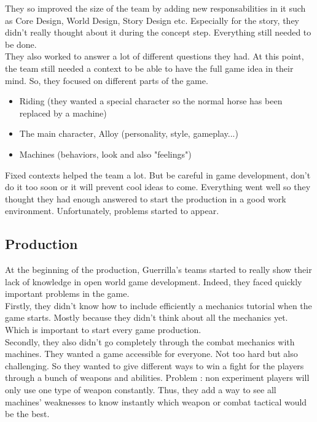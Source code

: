\documentclass[a4paper]{article}
\begin{document}
\noindent They so improved the size of the team by adding new responsabilities in it such as Core Design,
World Design, Story Design etc. Especially for the story, they didn't really thought about it
during the concept step. Everything still needed to be done.\\

\noindent They also worked to answer a lot of different questions they had. At this point, the team
still needed a context to be able to have the full game idea in their mind. So, they focused on
different parts of the game.
\begin{itemize}
  \item Riding (they wanted a special character so the normal horse has been replaced by a machine)
  \item The main character, Alloy (personality, style, gameplay...)
  \item Machines (behaviors, look and also "feelings")
\end{itemize}

\noindent Fixed contexts helped the team a lot. But be careful in game development, don't do it too 
soon or it will prevent cool ideas to come. Everything went well so they thought they had enough
answered to start the production in a good work environment. Unfortunately, problems started to appear.


\subsection{Production}

At the beginning of the production, Guerrilla's teams started to really show their lack of
knowledge in open world game development. Indeed, they faced quickly important problems in the game.\\

\noindent Firstly, they didn't know how to include efficiently a mechanics tutorial when the game starts.
Mostly because they didn't think about all the mechanics yet. Which is important to start every game
production.\\

\noindent Secondly, they also didn't go completely through the combat mechanics with machines.
They wanted a game accessible for everyone. Not too hard but also challenging. So they wanted
to give different ways to win a fight for the players through a bunch of weapons and abilities. Problem :
non experiment players will only use one type of weapon constantly. Thus, they add a way to see 
all machines' weaknesses to know instantly which weapon or combat tactical would be the best.\\
\end{document}
